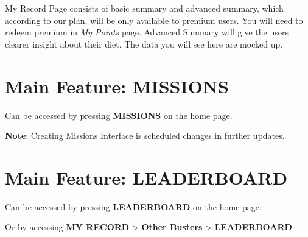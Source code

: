 \documentclass[a4paper,12pt]{article}
\begin{document}

My Record Page consists of basic summary and advanced summary, which according
to our plan, will be only available to premium users. You will need to
redeem premium in \textit{My Points} page.
Advanced Summary will give the users clearer insight about their diet.
The data you will see here are mocked up.

\pagebreak
\section{Main Feature: MISSIONS}

Can be accessed by pressing \textbf{MISSIONS} on the home page.


\textbf{Note}: Creating Missions Interface is scheduled changes in further updates.

\pagebreak
\section{Main Feature: LEADERBOARD}

Can be accessed by pressing \textbf{LEADERBOARD} on the home page.

\noindent
Or by accessing \textbf{MY RECORD} > \textbf{Other Busters} > \textbf{LEADERBOARD}

\end{document}
